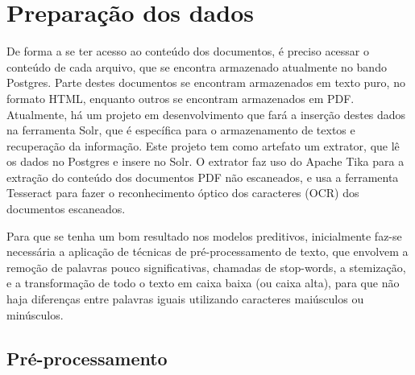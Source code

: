 

\section{Preparação dos dados}%

De forma a se ter acesso ao conteúdo dos documentos, é preciso acessar o conteúdo de cada arquivo, que se encontra armazenado atualmente no bando Postgres. Parte destes documentos se encontram armazenados em texto puro, no formato HTML, enquanto outros se encontram armazenados em PDF. Atualmente, há um projeto em desenvolvimento que fará a inserção destes dados na ferramenta Solr, que é específica para o armazenamento de textos e recuperação da informação. Este projeto tem como artefato um extrator, que lê os dados no Postgres e insere no Solr. O extrator faz uso do Apache Tika para a extração do conteúdo dos documentos PDF não escaneados, e usa a ferramenta Tesseract para fazer o reconhecimento óptico dos caracteres (OCR) dos documentos escaneados. 

Para que se tenha um bom resultado nos modelos preditivos, inicialmente faz-se necessária a aplicação de técnicas de pré-processamento de texto, que envolvem a remoção de palavras pouco significativas, chamadas de stop-words, a stemização, e a transformação de todo o texto em caixa baixa (ou caixa alta), para que não haja diferenças entre palavras iguais utilizando caracteres maiúsculos ou minúsculos. 






\subsection{Pré-processamento}%

